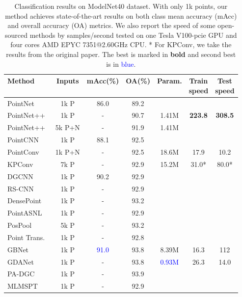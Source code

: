 \documentclass{article} \usepackage{iclr2022_conference,times}
\begin{document}
\begin{table}[]
\small
    \centering
    \caption{Classification results on ModelNet40 dataset. 
 With only 1k points, our method achieves state-of-the-art results on both class mean accuracy (mAcc) and overall accuracy (OA) metrics. We also report the speed of some open-sourced methods by samples/second tested on one Tesla V100-pcie GPU and four cores AMD EPYC 7351@2.60GHz CPU. * For KPConv, we take the results from the original paper. The best is marked in \textbf{bold} and second best is in \textcolor{blue}{blue}.}
 \vspace{1mm}
    \begin{tabular}{l|ccc|ccc}
    \toprule
         Method& Inputs & mAcc(\%) &OA(\%) & Param. &\makecell{ Train\\speed} &\makecell{ Test\\speed} \\
         \midrule
         PointNet~\citep{qi2017pointnet}   & 1k P &86.0 &89.2 & & & \\
         PointNet++~\citep{qi2017pointnet++} & 1k P &-&90.7  & 1.41M&\textbf{223.8} &\textbf{308.5} \\
         PointNet++~\citep{qi2017pointnet++} &5k P+N &-&91.9  & 1.41M& & \\
         \midrule
         PointCNN~\citep{li2018pointcnn}   &1k P &88.1&92.5  & & & \\
         
         PointConv~\citep{wu2019pointconv}  &1k P+N &-&92.5  &18.6M &17.9 &10.2 \\
         KPConv~\citep{thomas2019kpconv}     & 7k P &-&92.9  &15.2M &31.0* &80.0* \\
         DGCNN~\citep{wang2019dynamic}      & 1k P &90.2&92.9  & & &  \\
         RS-CNN~\citep{liu2019relation}     & 1k P &-&92.9  & & & \\
         DensePoint~\citep{liu2019densepoint} &1k P &-&93.2  & & & \\
         PointASNL~\citep{yan2020pointasnl}  & 1k P &-&92.9  & & & \\
         PosPool~\citep{liu2020closer}    &5k P &-&93.2  & & & \\
         Point Trans.~\citep{engel2020point}  &1k P &-&92.8  & & & \\
         GBNet~\citep{qiu2021geometric} &1k P &\textcolor{blue}{91.0} &93.8 &8.39M &16.3 &112 \\
         GDANet~\citep{xu2021learning}& 1k P &-&93.8  &\textcolor{blue}{0.93M} &26.3 & 14.0\\
         PA-DGC~\citep{xu2021paconv}    &1k P &-&93.9  & & & \\
         MLMSPT~\citep{han2021point}  &1k P &-&92.9  & & & \\
         

\end{tabular}
\end{table}
\end{document}
